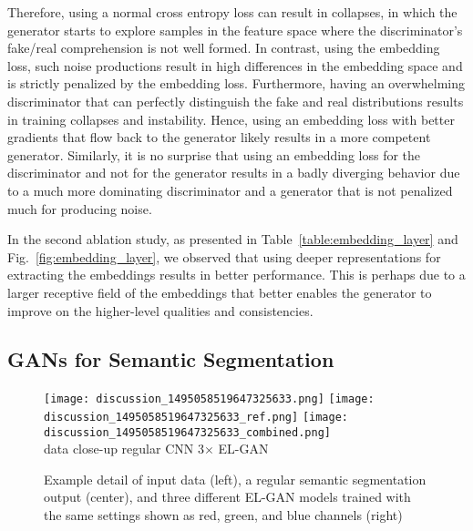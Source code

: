 \documentclass{article} \usepackage{nips13submit_e,times}
\newcommand{\elgan}{\mbox{EL-GAN}}
\begin{document}
Therefore, using a normal cross entropy loss can result in collapses, in which the generator starts to explore samples in the feature space where the discriminator's fake/real comprehension is not well formed. 
In contrast, using the embedding loss, such noise productions result in high differences in the embedding space and is strictly penalized by the embedding loss.
Furthermore, having an overwhelming discriminator that can perfectly distinguish the fake and real distributions results in training collapses and instability.
Hence, using an embedding loss with better gradients that flow back to the generator likely results in a more competent generator.
Similarly, it is no surprise that using an embedding loss for the discriminator and not for the generator results in a badly diverging behavior due to a much more dominating discriminator and a generator that is not penalized much for producing noise.

In the second ablation study, as presented in Table~\ref{table:embedding_layer} and Fig.~\ref{fig:embedding_layer}, we observed that using deeper representations for extracting the embeddings results in better performance.
This is perhaps due to a larger receptive field of the embeddings that better enables the generator to improve on the higher-level qualities and consistencies.

\subsection{GANs for Semantic Segmentation}

\begin{figure}[!t]
  \centering
  \texttt{[image: discussion\_1495058519647325633.png]}
  \texttt{[image: discussion\_1495058519647325633\_ref.png]}
  \texttt{[image: discussion\_1495058519647325633\_combined.png]}
  \\
  {data close-up \hspace{1em} regular CNN \hspace{1em} 3$\times$ \elgan{}}
  \caption{Example detail of input data (left), a regular semantic segmentation output (center), and three different \elgan{} models trained with the same settings shown as red, green, and blue channels (right)}
  \label{fig:discussion_illustration}
\end{figure}
\end{document}
